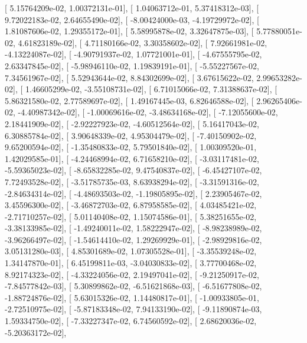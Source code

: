 \documentclass{article}
\begin{document}
       [  5.15764209e-02,   1.00372131e-01],
       [  1.04063712e-01,   5.37418312e-03],
       [  9.72022183e-02,   2.64655490e-02],
       [ -8.00424000e-03,  -4.19729972e-02],
       [  1.81087606e-02,   1.29355172e-01],
       [  5.58995878e-02,   3.32647875e-03],
       [  5.77880051e-02,   4.61823189e-02],
       [  4.71180166e-02,   3.30358602e-02],
       [  7.92661981e-02,  -4.13224087e-02],
       [ -4.90791937e-02,   1.07721001e-01],
       [ -4.67555795e-02,   2.63347845e-02],
       [ -5.98946110e-02,   1.19839191e-01],
       [ -5.55227567e-02,   7.34561967e-02],
       [  5.52943644e-02,   8.84302699e-02],
       [  3.67615622e-02,   2.99653282e-02],
       [  1.46605299e-02,  -3.55108731e-02],
       [  6.71015066e-02,   7.31388637e-02],
       [  5.86321580e-02,   2.77589697e-02],
       [  1.49167445e-03,   6.82646588e-02],
       [  2.96265406e-02,  -4.40987342e-02],
       [ -1.00069616e-02,  -3.48634168e-02],
       [ -7.12055600e-02,   2.18441909e-02],
       [ -2.92227923e-02,  -4.60512564e-02],
       [  5.16417043e-02,   6.30885784e-02],
       [  3.90648339e-02,   4.95304479e-02],
       [ -7.40150902e-02,   9.65200594e-02],
       [ -1.35480833e-02,   5.79501840e-02],
       [  1.00309520e-01,   1.42029585e-01],
       [ -4.24468994e-02,   6.71658210e-02],
       [ -3.03117481e-02,  -5.59365023e-02],
       [ -8.65832285e-02,   9.47540837e-02],
       [ -6.45427107e-02,   7.72493528e-02],
       [ -3.51785735e-03,   8.63938294e-02],
       [ -3.31591316e-02,  -2.84634314e-02],
       [ -4.48693503e-02,  -1.19805895e-02],
       [  2.23905467e-02,   3.45596300e-02],
       [ -3.46872703e-02,   6.87958585e-02],
       [  4.03485421e-02,  -2.71710257e-02],
       [  5.01140408e-02,   1.15074586e-01],
       [  5.38251655e-02,  -3.38133985e-02],
       [ -1.49240011e-02,   1.58222947e-02],
       [ -8.98238989e-02,  -3.96266497e-02],
       [ -1.54614410e-02,   1.29269929e-01],
       [ -2.98929816e-02,   3.05131280e-03],
       [  4.85301689e-02,   1.07305528e-01],
       [ -3.35539248e-02,   1.34147870e-01],
       [  6.45199811e-03,  -3.04030833e-02],
       [  3.77700468e-02,   8.92174323e-02],
       [ -4.33224056e-02,   2.19497041e-02],
       [ -9.21250917e-02,  -7.84577842e-03],
       [  5.30899862e-02,  -6.51621868e-03],
       [ -6.51677808e-02,  -1.88724876e-02],
       [  5.63015326e-02,   1.14480817e-01],
       [ -1.00933805e-01,  -2.72510975e-02],
       [ -5.87183348e-02,   7.94133190e-02],
       [ -9.11890874e-03,   1.59334750e-02],
       [ -7.33227347e-02,   6.74560592e-02],
       [  2.68620036e-02,  -5.20363172e-02],
\end{document}
